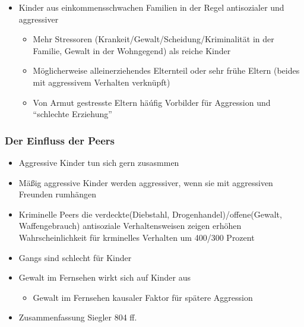 \begin{itemize}
\begin{itemize}
		\end{itemize}
	\item
		Kinder aus einkommensschwachen Familien in der Regel antisozialer und aggressiver
		\begin{itemize}
			\item
				Mehr Stressoren (Krankeit/Gewalt/Scheidung/Kriminalität in der Familie, Gewalt in der Wohngegend) als reiche Kinder
			\item
				Möglicherweise alleinerziehendes Elternteil oder sehr frühe Eltern (beides mit aggressivem Verhalten verknüpft)
			\item
				Von Armut gestresste Eltern häúfig Vorbilder für Aggression und \enquote{schlechte Erziehung}
		\end{itemize}
\end{itemize}


\subsubsection{Der Einfluss der Peers}
\begin{itemize}
	\item
		Aggressive Kinder tun sich gern zusasmmen
	\item
		Mäßig aggressive Kinder werden aggressiver, wenn sie mit aggressiven Freunden rumhängen
	\item
		Kriminelle Peers die verdeckte(Diebstahl, Drogenhandel)/offene(Gewalt, Waffengebrauch) antisoziale Verhaltensweisen zeigen erhöhen Wahrscheinlichkeit für krminelles Verhalten um 400/300 Prozent
	\item
		Gangs sind schlecht für Kinder
	\item
		Gewalt im Fernsehen wirkt sich auf Kinder aus
		\begin{itemize}
			\item
				Gewalt im Fernsehen kausaler Faktor für spätere Aggression
		\end{itemize}
	\item
		Zusammenfassung Siegler 804 ff.
\end{itemize}

